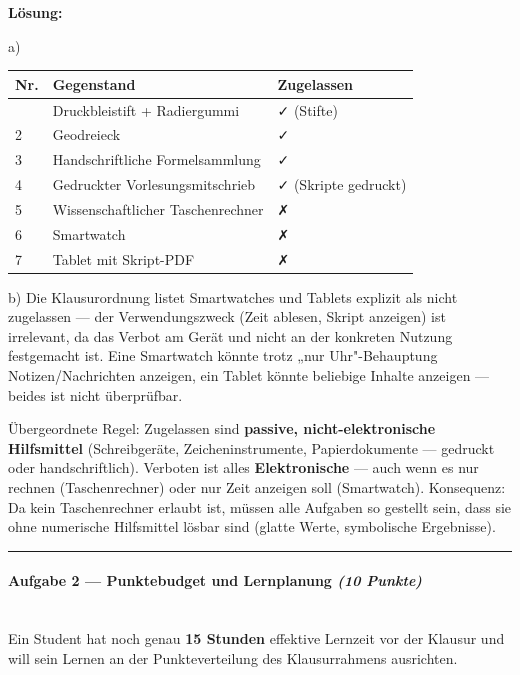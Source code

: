 \documentclass[11pt, a4paper]{article}
\begin{document}
\textbf{Lösung:}


a)



{\small
\begin{tabularx}{\linewidth}{XXX}
\hline
\rowcolor{tableheadbg}
{\color{white}\textbf{Nr.}} & {\color{white}\textbf{Gegenstand}} & {\color{white}\textbf{Zugelassen}} \\[2pt]
\hline
\endhead
\hline
\endfoot
1 & Druckbleistift + Radiergummi & ✓ (Stifte) \\
2 & Geodreieck & ✓ \\
3 & Handschriftliche Formelsammlung & ✓ \\
4 & Gedruckter Vorlesungsmitschrieb & ✓ (Skripte gedruckt) \\
5 & Wissenschaftlicher Taschenrechner & ✗ \\
6 & Smartwatch & ✗ \\
7 & Tablet mit Skript-PDF & ✗ \\
\end{tabularx}
}


b) Die Klausurordnung listet Smartwatches und Tablets explizit als nicht zugelassen — der Verwendungszweck (Zeit ablesen, Skript anzeigen) ist irrelevant, da das Verbot am Gerät und nicht an der konkreten Nutzung festgemacht ist. Eine Smartwatch könnte trotz „nur Uhr"-Behauptung Notizen/Nachrichten anzeigen, ein Tablet könnte beliebige Inhalte anzeigen — beides ist nicht überprüfbar.


Übergeordnete Regel: Zugelassen sind \textbf{passive, nicht-elektronische Hilfsmittel} (Schreibgeräte, Zeicheninstrumente, Papierdokumente — gedruckt oder handschriftlich). Verboten ist alles \textbf{Elektronische} — auch wenn es nur rechnen (Taschenrechner) oder nur Zeit anzeigen soll (Smartwatch). Konsequenz: Da kein Taschenrechner erlaubt ist, müssen alle Aufgaben so gestellt sein, dass sie ohne numerische Hilfsmittel lösbar sind (glatte Werte, symbolische Ergebnisse).



\noindent\textcolor{rulegray}{\rule{\linewidth}{0.4pt}}


\paragraph{Aufgabe 2 — Punktebudget und Lernplanung \textit{(10 Punkte)}}\mbox{}\\[2pt]

Ein Student hat noch genau \textbf{15 Stunden} effektive Lernzeit vor der Klausur und will sein Lernen an der Punkteverteilung des Klausurrahmens ausrichten.
\end{document}
